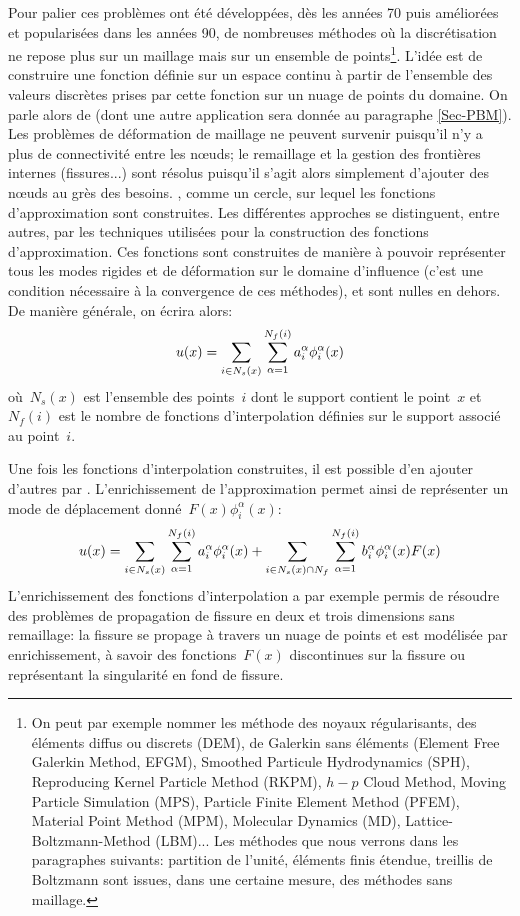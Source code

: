 \medskip
Pour palier ces problèmes ont été développées, dès les années 70 puis améliorées et popularisées dans les années 90, de nombreuses méthodes où la discrétisation ne repose plus sur un maillage mais sur un ensemble de points\footnote{On peut par exemple nommer les méthode des noyaux régularisants, des éléments diffus ou discrets (DEM), de Galerkin sans éléments (Element Free Galerkin Method, EFGM), Smoothed Particule Hydrodynamics (SPH), Reproducing Kernel Particle Method (RKPM), $h-p$ Cloud Method, Moving Particle Simulation (MPS), Particle Finite Element Method (PFEM), Material Point Method (MPM), Molecular Dynamics (MD), Lattice-Boltzmann-Method (LBM)... Les méthodes que nous verrons dans les paragraphes suivants: partition de l'unité, éléments finis étendue, treillis de Boltzmann sont issues, dans une certaine mesure, des méthodes sans maillage.}.
L'idée est de construire une fonction définie sur un espace continu à partir de l'ensemble des valeurs discrètes prises par cette fonction sur un nuage de points du domaine. On parle alors de  (dont une autre application sera donnée au paragraphe \ref{Sec-PBM}). Les problèmes de déformation de maillage ne peuvent survenir puisqu'il n'y a plus de connectivité entre les nœuds; le remaillage et la gestion des frontières internes (fissures...) sont résolus puisqu'il s'agit alors simplement d'ajouter des nœuds au grès des besoins.
, comme un cercle, sur lequel les fonctions d'approximation sont construites. Les différentes approches se distinguent, entre autres, par les techniques utilisées pour la construction des fonctions d'approximation. Ces fonctions sont construites de manière à pouvoir représenter tous les modes rigides et de déformation sur le domaine d'influence (c'est une condition nécessaire à la convergence de ces méthodes), et sont nulles en dehors. De manière générale, on écrira alors:
\begin{equation}\label{Eq-meshless}
u(x) = \displaystyle\sum_{i\in N_s(x)}\displaystyle\sum_{\alpha=1}^{N_f(i)} a_i^\alpha \phi_i^\alpha(x)
\end{equation}
où~$N_s(x)$ est l'ensemble des points~$i$ dont le support contient le point~$x$ et~$N_f (i)$ est le nombre de fonctions d'interpolation définies sur le support associé au point~$i$.

\medskip
Une fois les fonctions d'interpolation construites, il est possible d'en ajouter d'autres par . L'enrichissement de l'approximation permet ainsi de représenter un mode de déplacement donné~$F(x)\phi_i^\alpha(x)$:
\begin{equation}
u(x) = \displaystyle\sum_{i\in N_s(x)}\displaystyle\sum_{\alpha=1}^{N_f(i)} a_i^\alpha \phi_i^\alpha(x) + \displaystyle\sum_{i\in N_s(x)\cap N_f}\displaystyle\sum_{\alpha=1}^{N_f(i)} b_i^\alpha\phi_i^\alpha(x)F(x)
\end{equation}
L'enrichissement des fonctions d'interpolation a par exemple permis de résoudre des problèmes de propagation de fissure en deux et trois dimensions sans remaillage: la fissure se propage à travers un nuage de points et est modélisée par enrichissement, à savoir des fonctions~$F(x)$ discontinues sur la fissure ou représentant la singularité en fond de fissure.

